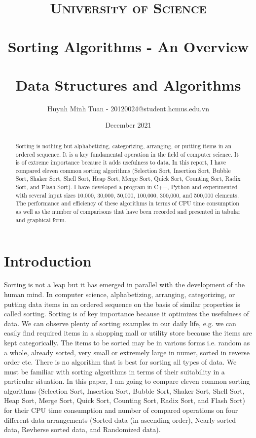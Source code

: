 \documentclass[11pt,a4paper]{article}
\title{
\normalfont \LARGE
\textsc{University of Science} \\ [25pt] %
\horrule{1pt} \\[0.4cm] %
\huge Sorting Algorithms - An Overview \\ %
\horrule{1pt} \\[0.6cm] %
\Large Data Structures and Algorithms\\[0.5cm]  %
}
\author{Huynh Minh Tuan - 20120024@student.hcmus.edu.vn}
\date{December 2021}
\newcommand\tab[1][1cm]{\hspace*{#1}}
\begin{document}
\maketitle

\begin{abstract}
    Sorting is nothing but alphabetizing, categorizing, arranging, or putting items in an ordered sequence. 
    It is a key fundamental operation in the field of computer science. It is of extreme importance because it adds usefulness to data.
    In this report, I have compared eleven common sorting algorithms (Selection Sort, Insertion Sort, Bubble Sort, Shaker Sort, Shell Sort, Heap
    Sort, Merge Sort, Quick Sort, Counting Sort, Radix Sort, and Flash Sort). I have developed a program in C++, Python and experimented with several input sizes
    10,000, 30,000, 50,000, 100,000, 300,000, and 500,000 elements. The performance and efficiency of these algorithms in terms of CPU time consumption 
    as well as the number of comparisons that have been recorded and presented in tabular and graphical form.
\end{abstract}

\section{Introduction}
\tab Sorting is not a leap but it has emerged in parallel with the development of the human mind.
In computer science, alphabetizing, arranging, categorizing, or putting data items in an ordered sequence on the basis of similar properties is called sorting.
Sorting is of key importance because it optimizes the usefulness of data.
\newline
\newline
\tab We can observe plenty of sorting examples in our daily life, e.g. we can easily find required items in a shopping mall or utility store because the items are kept categorically.
The items to be sorted may be in various forms i.e. random as a whole, already sorted, very small or extremely large in numer, sorted in reverse order etc.
There is no algorithm that is best for sorting all types of data. 
We must be familiar with sorting algorithms in terms of their suitability in a particular situation.
\newline
\newline
\tab In this paper, I am going to compare eleven common sorting algorithms (Selection Sort, Insertion Sort, Bubble Sort, Shaker Sort, Shell Sort, Heap
Sort, Merge Sort, Quick Sort, Counting Sort, Radix Sort, and Flash Sort) for their CPU time consumption and number of compared operations on four different data arrangements 
(Sorted data (in ascending order), Nearly sorted data, Revherse sorted data, and Randomized data).
\end{document}
